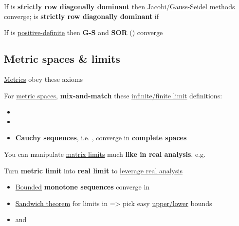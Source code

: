 \hSep %

If  is \textbf{strictly row diagonally dominant} then \underline{Jacobi/Gauss-Seidel methods} converge;
 is \textbf{strictly row diagonally dominant} if 

If  is \underline{positive-definite} then \textbf{G-S} and \textbf{SOR} () converge

\subsection*{Metric spaces \& limits}

\underline{Metrics} obey these axioms


\hSep %

For \underline{metric spaces}, \textbf{mix-and-match} these \underline{infinite/finite limit}
definitions:
\begin{itemize}
      \item
      \item
      \item
            \textbf{Cauchy sequences},
            i.e. ,
            converge in \textbf{complete spaces}
\end{itemize}
You can manipulate \underline{matrix limits} much \textbf{like in real analysis},
e.g. 

\hSep %

Turn \textbf{metric limit}  into \textbf{real limit}
 to \underline{leverage real analysis}
\begin{itemize}
      \item
            \underline{Bounded} \textbf{monotone sequences} converge in 
      \item
            \underline{Sandwich theorem} for limits in  =>
            pick easy \underline{upper/lower} bounds
      \item
             and
\end{itemize}
